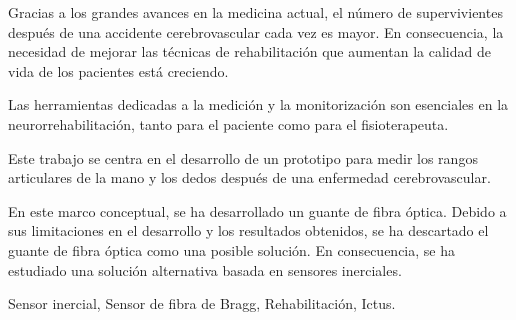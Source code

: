 \begin{abstractEs} %
Gracias a los grandes avances en la medicina actual, el número de supervivientes después de una accidente cerebrovascular cada vez es mayor. En consecuencia, la necesidad de mejorar las técnicas de rehabilitación que aumentan la calidad de vida de los pacientes está creciendo.

Las herramientas dedicadas a la medición y la monitorización son esenciales en la neurorrehabilitación, tanto para el paciente como para el fisioterapeuta.

Este trabajo se centra en el desarrollo de un prototipo para medir los rangos articulares de la mano y los dedos después de una enfermedad cerebrovascular.

En este marco conceptual, se ha desarrollado un guante de fibra óptica. Debido a sus limitaciones en el desarrollo y los resultados obtenidos, se ha descartado el guante de fibra óptica como una posible solución. En consecuencia, se ha estudiado una solución alternativa basada en sensores inerciales.


\end{abstractEs}

\begin{keywordsEs}
Sensor inercial, Sensor de fibra de Bragg, Rehabilitación, Ictus.
\end{keywordsEs}
